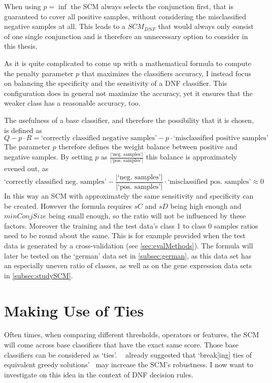 When using \(p = \inf\) the SCM always selects the conjunction first, that is guaranteed to cover all positive samples, without considering
the misclassified negative samples at all.
This leads to a \(SCM_{DNF}\) that would always only consist of one single conjunction and
is therefore an unnecessary option to consider in this thesis.

As it is quite complicated to come up with a mathematical formula to compute the penalty parameter \(p\)
that maximizes the classifiers accuracy, I instead focus on balancing the
specificity and the sensitivity of a DNF classifier.
This configuration does in general not maximize the accuracy, yet it ensures that the weaker class has a reasonable accuracy, too. %

The usefulness of a base classifier, and therefore the possibility that it is chosen, is defined as
\[Q - p \cdot R = \text{`correctly classified negative samples'} - p \cdot \text{`misclassified positive samples'}\]
The parameter \(p\) therefore defines the weight balance between positive and negative samples.
By setting \(p\) as \(\frac{|\text{`neg.\ samples'}|}{|\text{`pos.\ samples'}|}\) this balance is approximately evened out,
as \[\text{`correctly classified neg.\ samples'} - \frac{|\text{`neg.\ samples'}|}{|\text{`pos.\ samples'}|} \cdot \text{`misclassified pos.\ samples'} \approx 0\]
In this way an SCM with approximately the same sensitivity and specificity can be created.
However the formula requires \(sC\) and \(sD\) being high enough and \(minConjSize\) being small enough, so the ratio will not be influenced by these factors.
Moreover the training and the test data's class 1 to class 0 samples ratios need to be round about the same.
This is for example provided when the test data is generated by a cross-validation (see \autoref{sec:evalMethods}).
The formula will later be tested on the `german' data set in \autoref{subsec:german}, as this data set has an especially uneven ratio of classes,
as well as on the gene expression data sets in \autoref{subsec:studySCM}.

\section{Making Use of Ties}\label{sec:ties}

Often times, when comparing different thresholds, operators or features, the SCM will come across base classifiers that have the exact same score.
Those base classifiers can be considered as `ties'.
~\cite{kestler06} already suggested that `break[ing] ties of equivalent greedy solutions'~\citep[p. 296]{kestler06} may increase the SCM's robustness.
I now want to investigate on this idea in the context of DNF decision rules.

